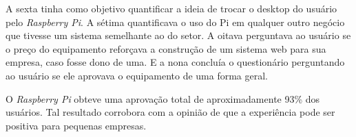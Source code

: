 A sexta tinha como objetivo quantificar a ideia de trocar o desktop do usuário pelo \textit{Raspberry Pi}. A sétima quantificava o uso do Pi em qualquer outro negócio que tivesse um sistema semelhante ao do setor. A oitava perguntava ao usuário se o preço do equipamento reforçava a construção de um sistema web para sua empresa, caso fosse dono de uma. E a nona concluía o questionário perguntando ao usuário se ele aprovava o equipamento de uma forma geral.

O \textit{Raspberry Pi} obteve uma aprovação total de aproximadamente 93\% dos usuários. Tal resultado corrobora com a opinião de que a experiência pode ser positiva para pequenas empresas.